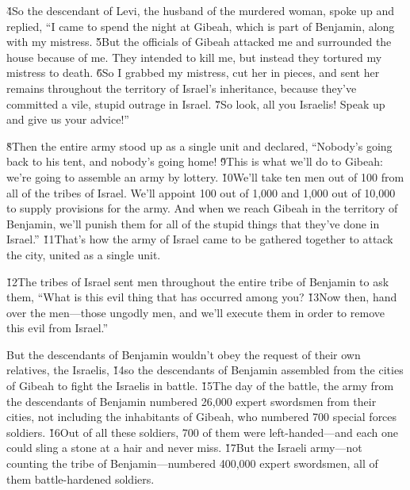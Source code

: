 \v{4}So the descendant of Levi, the husband of the murdered woman, spoke up and replied, ``I came to spend the night at Gibeah, which is part of Benjamin, along with my mistress. \v{5}But the officials of Gibeah attacked me and surrounded the house because of me. They intended to kill me, but instead they tortured my mistress to death. \v{6}So I grabbed my mistress, cut her in pieces, and sent her remains throughout the territory of Israel's inheritance, because they've committed a vile, stupid outrage in Israel. \v{7}So look, all you Israelis! Speak up and give us your advice!''

\v{8}Then the entire army stood up as a single unit and declared, ``Nobody's going back to his tent, and nobody's going home! \v{9}This is what we'll do to Gibeah: we're going to assemble an army by lottery. \v{10}We'll take ten men out of 100 from all of the tribes of Israel. We'll appoint 100 out of 1,000 and 1,000 out of 10,000 to supply provisions for the army. And when we reach Gibeah in the territory of Benjamin, we'll punish them for all of the stupid things that they've done in Israel.'' \v{11}That's how the army of Israel came to be gathered together to attack the city, united as a single unit.

\v{12}The tribes of Israel sent men throughout the entire tribe of Benjamin to ask them, ``What is this evil thing that has occurred among you? \v{13}Now then, hand over the men---those ungodly men, and we'll execute them in order to remove this evil from Israel.''

But the descendants of Benjamin wouldn't obey the request of their own relatives, the Israelis, \v{14}so the descendants of Benjamin assembled from the cities of Gibeah to fight the Israelis in battle. \v{15}The day of the battle, the army from the descendants of Benjamin numbered 26,000 expert swordsmen from their cities, not including the inhabitants of Gibeah, who numbered 700 special forces soldiers. \v{16}Out of all these soldiers, 700 of them were left-handed---and each one could sling a stone at a hair and never miss. \v{17}But the Israeli army---not counting the tribe of Benjamin---numbered 400,000 expert swordsmen, all of them battle-hardened soldiers.

